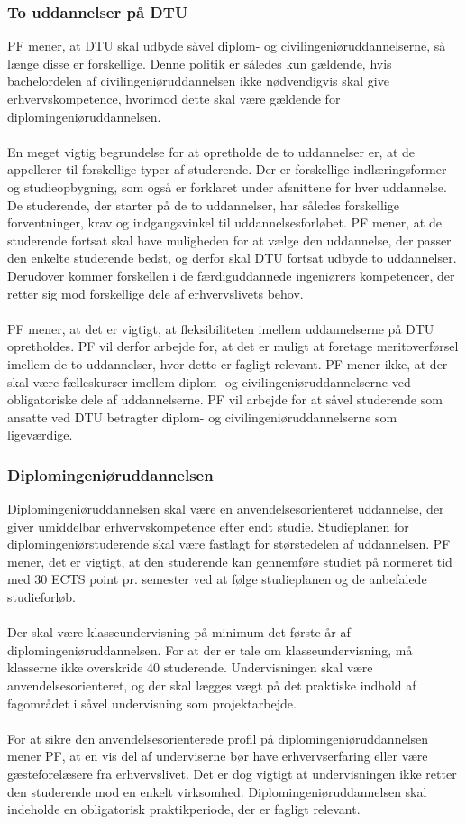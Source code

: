 \subsubsection{To uddannelser på DTU}
PF mener, at DTU skal udbyde såvel diplom- og civilingeniøruddannelserne, så længe disse er forskellige. Denne politik er således kun gældende, hvis bachelordelen af civilingeniøruddannelsen ikke nødvendigvis skal give erhvervskompetence, hvorimod dette skal være gældende for diplomingeniøruddannelsen.\\
\\
En meget vigtig begrundelse for at opretholde de to uddannelser er, at de appellerer til forskellige typer af studerende. Der er forskellige indlæringsformer og studieopbygning, som også er forklaret under afsnittene for hver uddannelse. De studerende, der starter på de to uddannelser, har således forskellige forventninger, krav og indgangsvinkel til uddannelsesforløbet. PF mener, at de studerende fortsat skal have muligheden for at vælge den uddannelse, der passer den enkelte studerende bedst, og derfor skal DTU fortsat udbyde to uddannelser. Derudover kommer forskellen i de færdiguddannede ingeniørers kompetencer, der retter sig mod forskellige dele af erhvervslivets behov.\\
\\
PF mener, at det er vigtigt, at fleksibiliteten imellem uddannelserne på DTU opretholdes. PF vil derfor arbejde for, at
det er muligt at foretage meritoverførsel imellem de to uddannelser, hvor dette er fagligt relevant. PF mener ikke, at der skal være fælleskurser imellem diplom- og civilingeniøruddannelserne ved obligatoriske dele af uddannelserne. PF vil arbejde for at såvel studerende som ansatte ved DTU betragter diplom- og civilingeniøruddannelserne som ligeværdige.

\subsubsection{Diplomingeniøruddannelsen}
Diplomingeniøruddannelsen skal være en anvendelsesorienteret uddannelse, der giver umiddelbar erhvervskompetence efter endt studie. Studieplanen for diplomingeniørstuderende skal være fastlagt for størstedelen af uddannelsen. PF mener, det er vigtigt, at den studerende kan gennemføre studiet på normeret tid med 30 ECTS point pr. semester ved at følge studieplanen og de anbefalede studieforløb.\\
\\
Der skal være klasseundervisning på minimum det første år af diplomingeniøruddannelsen. For at der er tale om klasseundervisning, må klasserne ikke overskride 40 studerende. Undervisningen skal være anvendelsesorienteret, og der skal lægges vægt på det praktiske indhold af fagområdet i såvel undervisning som projektarbejde.\\
\\
For at sikre den anvendelsesorienterede profil på diplomingeniøruddannelsen mener PF, at en vis del af underviserne bør have erhvervserfaring eller være gæsteforelæsere fra erhvervslivet. Det er dog vigtigt at undervisningen ikke retter den studerende mod en enkelt virksomhed. Diplomingeniøruddannelsen skal indeholde en obligatorisk praktikperiode, der er fagligt relevant.

